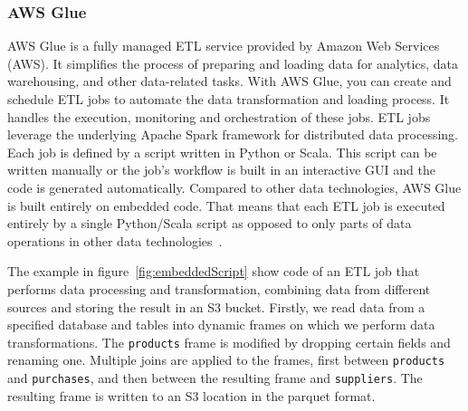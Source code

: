 \subsubsection{AWS Glue}
AWS Glue is a fully managed ETL service provided by Amazon Web Services (AWS). It simplifies the process of preparing and loading data for analytics, data warehousing, and other data-related tasks. With AWS Glue, you can create and schedule ETL jobs to automate the data transformation and loading process. It handles the execution, monitoring and orchestration of these jobs. ETL jobs leverage the underlying Apache Spark framework for distributed data processing. Each job is defined by a script written in Python or Scala. This script can be written manually or the job's workflow is built in an interactive GUI and the code is generated automatically. Compared to other data technologies, AWS Glue is built entirely on embedded code. That means that each ETL job is executed entirely by a single Python/Scala script as opposed to only parts of data operations in other data technologies~\cite{awsglueintro}.
\par
The example in figure~\ref{fig:embeddedScript} show code of an ETL job that performs data processing and transformation, combining data from different sources and storing the result in an S3 bucket. Firstly, we read data from a specified database and tables into dynamic frames on which we perform data transformations. The \texttt{products} frame is modified by dropping certain fields and renaming one. Multiple joins are applied to the frames, first between \texttt{products} and \texttt{purchases}, and then between the resulting frame and \texttt{suppliers}. The resulting frame is written to an S3 location in the parquet format.

